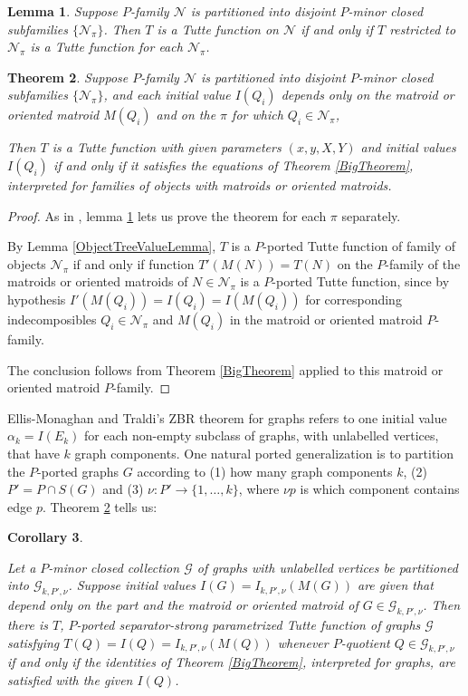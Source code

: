 \documentclass[12pt,leqno]{amsart}
\newtheorem{lem}{Lemma}
\newtheorem{cor}[lem]{Corollary}
\newtheorem{thm}[lem]{Theorem}
\theoremstyle{remark}
\begin{document}
\begin{lem}
\label{DisjSubclassLem}
Suppose $P$-family $\mathcal{N}$ is partitioned into
disjoint $P$-minor closed subfamilies $\{\mathcal{N}_{\pi}\}$.
Then $T$ is a Tutte function on $\mathcal{N}$ if and
only if $T$ restricted to $\mathcal{N}_{\pi}$ is
a Tutte function for each $\mathcal{N}_{\pi}$.
\end{lem}

\begin{thm}
\label{ZBRWildFamily}
Suppose $P$-family $\mathcal{N}$ is partitioned into
disjoint $P$-minor closed subfamilies $\{\mathcal{N}_{\pi}\}$,
and each initial value $I(Q_i)$ depends only on
the matroid or oriented matroid $M(Q_i)$ and on the
$\pi$ for which $Q_i\in\mathcal{N}_{\pi}$,

Then $T$ is a Tutte function with given parameters $(x,y,X,Y)$
and initial values $I(Q_i)$ if and only if it satisfies
the equations of Theorem \ref{BigTheorem}, interpreted
for families of objects with matroids or oriented matroids.
\end{thm}

\begin{proof}
As in \cite{Ellis-Monaghan-Traldi}, lemma
\ref{DisjSubclassLem} lets us prove the
theorem for each $\pi$ separately.


By Lemma \ref{ObjectTreeValueLemma}, $T$ is a 
$P$-ported Tutte function of family
of objects $\mathcal{N}_{\pi}$ if and only
if function $T'(M(N))=T(N)$ on the $P$-family of
the matroids or oriented matroids of
$N\in\mathcal{N}_{\pi}$ is a $P$-ported Tutte 
function, since by hypothesis 
$I'(M(Q_i))=I(Q_i)=I(M(Q_i))$ for corresponding
indecomposibles $Q_i\in\mathcal{N}_{\pi}$ and 
$M(Q_i)$ in the matroid or oriented matroid $P$-family.

The conclusion follows
from Theorem \ref{BigTheorem} applied to
this matroid or oriented matroid $P$-family.
\end{proof}


Ellis-Monaghan and Traldi's ZBR theorem for graphs 
refers to one initial value $\mathcal{\alpha}_k=I(E_k)$
for each non-empty subclass of graphs, with unlabelled vertices, that
have $k$ graph components.  One natural ported generalization
is to partition the $P$-ported graphs $G$
according to (1) how many
graph components $k$, (2) $P'=P\cap S(G)$ and (3)
$\nu:P'\rightarrow\{1,\ldots,k\}$, where $\nu{p}$ is which
component contains edge $p$.  Theorem
\ref{ZBRWildFamily} tells us:

\begin{cor}
\label{PZBRGraphCor1}

Let a $P$-minor closed collection $\mathcal{G}$ of graphs with unlabelled
vertices be partitioned into $\mathcal{G}_{k,P',\nu}$.  Suppose initial
values $I(G)=I_{k,P',\nu}(M(G))$ are given that depend only on the 
part and the matroid or oriented matroid of $G\in\mathcal{G}_{k,P',\nu}$.
Then there is $T$, $P$-ported separator-strong parametrized Tutte function
of graphs $\mathcal{G}$ satisfying $T(Q)=I(Q)=I_{k,P',\nu}(M(Q))$ whenever
$P$-quotient $Q\in\mathcal{G}_{k,P',\nu}$ if and only if the identities
of Theorem \ref{BigTheorem}, interpreted for graphs, are satisfied with 
the given $I(Q)$.
\end{cor}
\end{document}
